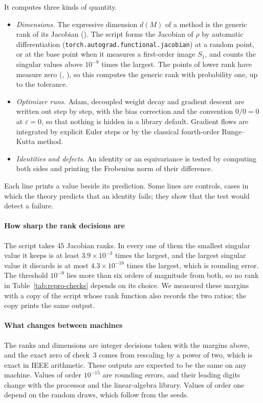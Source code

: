 It computes three kinds of quantity.
\begin{itemize}
  \item \emph{Dimensions.} The expressive dimension $d(M)$ of a method is the generic rank of its Jacobian
  (). The script forms the Jacobian of $\rho$ by automatic differentiation
  (\texttt{torch.autograd.functional.jacobian}) at a random point, or at the base point when it measures a first-order
  image $S_1$, and counts the singular values above $10^{-9}$ times the largest. The points of lower rank have measure
  zero (, ), so this computes the generic rank with probability one, up to the tolerance.
  \item \emph{Optimizer runs.} Adam, decoupled weight decay and gradient descent are written out step by step, with the
  bias correction and the convention $0/0=0$ at $\varepsilon=0$, so that nothing is hidden in a library default. Gradient
  flows are integrated by explicit Euler steps or by the classical fourth-order Runge--Kutta method.
  \item \emph{Identities and defects.} An identity or an equivariance is tested by computing both sides and printing the
  Frobenius norm of their difference.
\end{itemize}
Each line prints a value beside its prediction. Some lines are controls, cases in which the theory predicts that an
identity fails; they show that the test would detect a failure.

\paragraph{How sharp the rank decisions are}
The script takes $45$ Jacobian ranks. In every one of them the smallest singular value it keeps is at least
$3.9\times10^{-3}$ times the largest, and the largest singular value it discards is at most $4.3\times10^{-16}$ times the
largest, which is rounding error. The threshold $10^{-9}$ lies more than six orders of magnitude from both, so no rank in
Table~\ref{tab:repro-checks} depends on its choice. We measured these margins with a copy of the script whose rank
function also records the two ratios; the copy prints the same output.

\paragraph{What changes between machines}
The ranks and dimensions are integer decisions taken with the margins above, and the exact zero of check~3 comes from
rescaling by a power of two, which is exact in IEEE arithmetic. These outputs are expected to be the same on any machine.
Values of order $10^{-15}$ are rounding errors, and their leading digits change with the processor and the
linear-algebra library. Values of order one depend on the random draws, which follow from the seeds.

